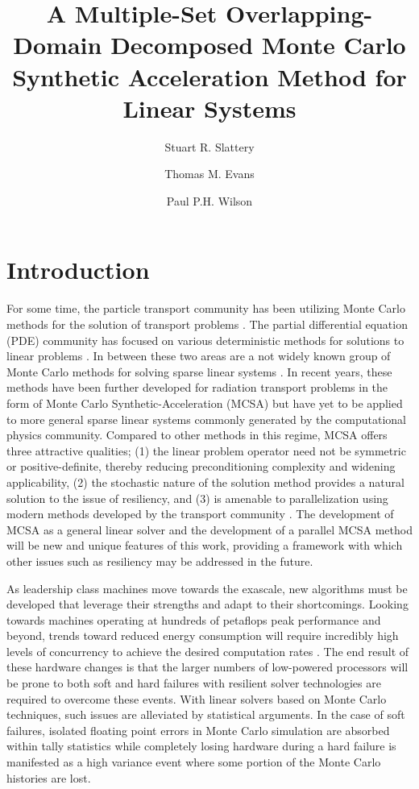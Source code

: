 \documentclass{snamc2013}
\title{A Multiple-Set Overlapping-Domain Decomposed Monte Carlo
  Synthetic Acceleration Method for Linear Systems}
\author[1]{Stuart R. Slattery}
\author[2]{Thomas M. Evans}
\author[1]{Paul P.H. Wilson}
\affil[1]{University of Wisconsin - Madison, Engineering Physics
  Department, 1500 Engineering Drive, Madison, WI 53706}
\affil[2]{Oak Ridge National Laboratory, One Bethel Valley Road, Oak
  Ridge, TN 37830}
\begin{document}
\section{Introduction}

For some time, the particle transport community has been utilizing
Monte Carlo methods for the solution of transport problems
\cite{lewis_computational_1993}. The partial differential equation
(PDE) community has focused on various deterministic methods for
solutions to linear problems \cite{saad_iterative_2003}. In between
these two areas are a not widely known group of Monte Carlo methods
for solving sparse linear systems \cite{forsythe_matrix_1950,
  hammersley_monte_1964, halton_sequential_1962,
  halton_sequential_1994}. In recent years, these methods have been
further developed for radiation transport problems in the form of
Monte Carlo Synthetic-Acceleration (MCSA) \cite{evans_monte_2009,
  evans_monte_2012} but have yet to be applied to more general sparse
linear systems commonly generated by the computational physics
community. Compared to other methods in this regime, MCSA offers three
attractive qualities; (1) the linear problem operator need not be
symmetric or positive-definite, thereby reducing preconditioning
complexity and widening applicability, (2) the stochastic nature of
the solution method provides a natural solution to the issue of
resiliency, and (3) is amenable to parallelization using modern
methods developed by the transport community
\cite{wagner_hybrid_2010}. The development of MCSA as a general linear
solver and the development of a parallel MCSA method will be new and
unique features of this work, providing a framework with which other
issues such as resiliency may be addressed in the future.

As leadership class machines move towards the exascale, new algorithms
must be developed that leverage their strengths and adapt to their
shortcomings. Looking towards machines operating at hundreds of
petaflops peak performance and beyond, trends toward reduced energy
consumption will require incredibly high levels of concurrency to
achieve the desired computation rates \cite{kogge_using_2011}. The end
result of these hardware changes is that the larger numbers of
low-powered processors will be prone to both soft and hard failures
with resilient solver technologies are required to overcome these
events. With linear solvers based on Monte Carlo techniques, such
issues are alleviated by statistical arguments. In the case of soft
failures, isolated floating point errors in Monte Carlo simulation are
absorbed within tally statistics while completely losing hardware
during a hard failure is manifested as a high variance event where
some portion of the Monte Carlo histories are lost.
\end{document}
